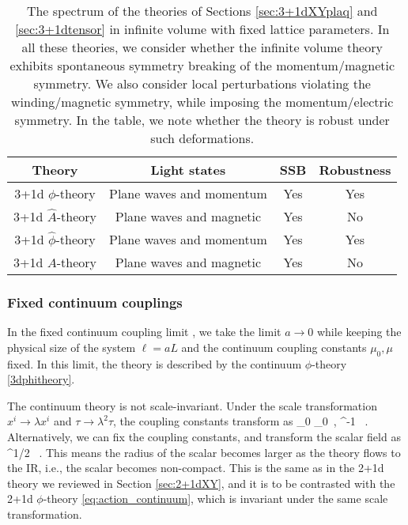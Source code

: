 \documentclass[12pt]{article}
\numberwithin{equation}{section}
\begin{document}
\begin{table}[t]
	\begin{center}
		\begin{tabular}{|c|c|c|c|}
			\hline
			Theory & Light states & SSB & Robustness
			\tabularnewline
			\hline
			3+1d $\phi$-theory & Plane waves and momentum & Yes & Yes
			\tabularnewline
			3+1d $\hat A$-theory & Plane waves and magnetic & Yes & No
			\tabularnewline
			\hline
			3+1d $\hat \phi$-theory & Plane waves and momentum & Yes & Yes
			\tabularnewline
			3+1d $A$-theory & Plane waves and magnetic & Yes & No
			\tabularnewline
			\hline
		\end{tabular}
		\caption{The spectrum of the theories of Sections \ref{sec:3+1dXYplaq} and \ref{sec:3+1dtensor} in infinite volume with fixed lattice parameters. In all these theories, we consider whether the infinite volume theory exhibits spontaneous symmetry breaking of the momentum/magnetic symmetry. We also consider local perturbations violating the winding/magnetic symmetry, while imposing the momentum/electric symmetry.  In the table, we note whether the theory is robust under such deformations.
		}\label{tbl:latticelargeL2}
	\end{center}
\end{table}


\subsubsection{Fixed continuum couplings}



In the fixed continuum coupling limit \cite{paper2}, we take the limit $a\rightarrow 0$ while keeping the physical size of the system $\ell=aL$ and the continuum coupling constants $\mu_0,\mu$ fixed. In this limit, the theory is described by the continuum $\phi$-theory \eqref{3dphitheory}.

The continuum theory is not scale-invariant. Under the scale transformation $x^i \rightarrow \lambda x^i$ and $\tau \rightarrow \lambda^2 \tau$, the coupling constants transform as
\ie
\mu_0 \rightarrow \lambda\mu_0~, \qquad \mu \rightarrow \lambda^{-1} \mu~.
\fe
Alternatively, we can fix the coupling constants, and transform the scalar field as
\ie
\phi \rightarrow \lambda^{1/2} \phi~.
\fe
This means the radius of the scalar becomes larger as the theory flows to the IR, i.e., the scalar becomes non-compact. This is the same as in the 2+1d theory we reviewed in Section \ref{sec:2+1dXY}, and it is to be contrasted with the 2+1d $\phi$-theory \eqref{eq:action_continuum}, which is invariant under the same scale transformation.
\end{document}
